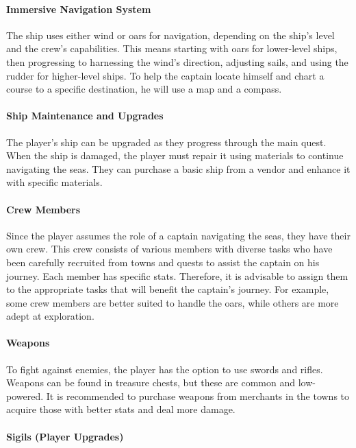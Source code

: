 \documentclass{article}
\begin{document}
\paragraph{Immersive Navigation System}\hfill

The ship uses either wind or oars for navigation, depending on the ship's level and the crew's capabilities. This means starting with oars for lower-level ships, then progressing to harnessing the wind's direction, adjusting sails, and using the rudder for higher-level ships. To help the captain locate himself and chart a course to a specific destination, he will use a map and a compass.

\paragraph{Ship Maintenance and Upgrades}\hfill

The player's ship can be upgraded as they progress through the main quest. When the ship is damaged, the player must repair it using materials to continue navigating the seas. They can purchase a basic ship from a vendor and enhance it with specific materials.

\paragraph{Crew Members}\hfill

Since the player assumes the role of a captain navigating the seas, they have their own crew. This crew consists of various members with diverse tasks who have been carefully recruited from towns and quests to assist the captain on his journey. Each member has specific stats. Therefore, it is advisable to assign them to the appropriate tasks that will benefit the captain's journey. For example, some crew members are better suited to handle the oars, while others are more adept at exploration.

\paragraph{Weapons}\hfill

To fight against enemies, the player has the option to use swords and rifles. Weapons can be found in treasure chests, but these are common and low-powered. It is recommended to purchase weapons from merchants in the towns to acquire those with better stats and deal more damage.

\paragraph{Sigils (Player Upgrades)}\hfill
\end{document}
